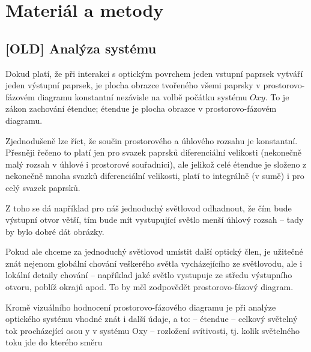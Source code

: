 \chapter{Materiál a metody}





\newpage
\section*{[OLD] Analýza systému}




Dokud platí, že při interakci s optickým povrchem jeden vstupní paprsek
vytváří jeden výstupní paprsek, je plocha obrazce tvořeného všemi
paprsky v prostorovo-fázovém diagramu konstantní nezávisle na volbě
počátku systému $Oxy$. To je zákon zachování étendue; étendue
je plocha obrazce v prostorovo-fázovém diagramu.

Zjednodušeně lze říct, že součin prostorového a úhlového rozsahu je
konstantní. Přesněji řečeno to platí jen pro svazek paprsků
diferenciální velikosti (nekonečně malý rozsah v úhlové i prostorové
souřadnici), ale jelikož celé étendue je složeno z nekonečně mnoha
svazků diferenciální velikosti, platí to integrálně (v sumě) i pro celý
svazek paprsků.


Z toho se dá například pro náš jednoduchý světlovod odhadnout, že čím
bude výstupní otvor větší, tím bude mít vystupující světlo menší úhlový
rozsah -- tady by bylo dobré dát obrázky.

Pokud ale chceme za jednoduchý světlovod umístit další optický člen, je
užitečné znát nejenom globální chování veškerého světla vycházejícího ze
světlovodu, ale i lokální detaily chování -- například jaké světlo
vystupuje ze středu výstupního otvoru, poblíž okrajů apod. To by měl
zodpovědět prostorovo-fázový diagram.

Kromě vizuálního hodnocení prostorovo-fázového diagramu je při analýze
optického systému vhodné znát i další údaje, a to:
-- étendue
-- celkový světelný tok procházející osou y v systému Oxy
-- rozložení svítivosti, tj. kolik světelného toku jde do kterého směru

